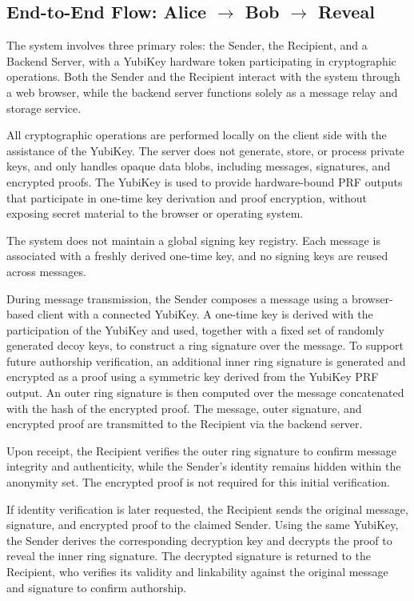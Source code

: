\documentclass[letterpaper,11pt]{article}
\begin{document}
\subsection{End-to-End Flow: Alice \texorpdfstring{$\rightarrow$}{--->} Bob \texorpdfstring{$\rightarrow$}{--->} Reveal}
The system involves three primary roles: the Sender, the Recipient, and a Backend Server, with a YubiKey hardware token participating in cryptographic operations. Both the Sender and the Recipient interact with the system through a web browser, while the backend server functions solely as a message relay and storage service.

All cryptographic operations are performed locally on the client side with the assistance of the YubiKey. The server does not generate, store, or process private keys, and only handles opaque data blobs, including messages, signatures, and encrypted proofs. The YubiKey is used to provide hardware-bound PRF outputs that participate in one-time key derivation and proof encryption, without exposing secret material to the browser or operating system.

The system does not maintain a global signing key registry. Each message is associated with a freshly derived one-time key, and no signing keys are reused across messages.

During message transmission, the Sender composes a message using a browser-based client with a connected YubiKey. A one-time key is derived with the participation of the YubiKey and used, together with a fixed set of randomly generated decoy keys, to construct a ring signature over the message. To support future authorship verification, an additional inner ring signature is generated and encrypted as a proof using a symmetric key derived from the YubiKey PRF output. An outer ring signature is then computed over the message concatenated with the hash of the encrypted proof. The message, outer signature, and encrypted proof are transmitted to the Recipient via the backend server.

Upon receipt, the Recipient verifies the outer ring signature to confirm message integrity and authenticity, while the Sender's identity remains hidden within the anonymity set. The encrypted proof is not required for this initial verification.

If identity verification is later requested, the Recipient sends the original message, signature, and encrypted proof to the claimed Sender. Using the same YubiKey, the Sender derives the corresponding decryption key and decrypts the proof to reveal the inner ring signature. The decrypted signature is returned to the Recipient, who verifies its validity and linkability against the original message and signature to confirm authorship.
\end{document}
